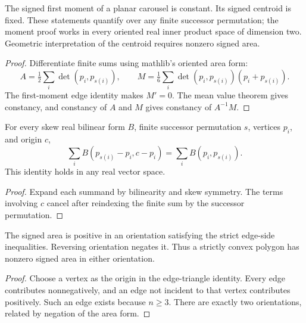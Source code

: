 \begin{proposition}
\label{prop:invariants}
\leanok
{}
The signed first moment of a planar carousel is constant.
Its signed centroid is fixed. These statements quantify over any finite
successor permutation; the moment proof works in every oriented real
inner product space of dimension two. Geometric interpretation of the
centroid requires nonzero signed area.
\end{proposition}
\begin{proof}
\leanok
Differentiate finite sums using mathlib's oriented area form:
\[
 A=\tfrac12\sum_i\det(p_i,p_{s(i)}),\qquad
 M=\tfrac16\sum_i\det(p_i,p_{s(i)})(p_i+p_{s(i)}).
\]
The first-moment edge identity makes $M'=0$. The mean value theorem gives
constancy, and constancy of $A$ and $M$ gives constancy of $A^{-1}M$.
\end{proof}

\begin{lemma}
\label{lem:edge-origin}
\leanok
For every skew real bilinear form $B$, finite successor permutation $s$,
vertices $p_i$, and origin $c$,
\[
 \sum_i B(p_{s(i)}-p_i,c-p_i)=\sum_i B(p_i,p_{s(i)}).
\]
This identity holds in any real vector space.
\end{lemma}
\begin{proof}
\leanok
Expand each summand by bilinearity and skew symmetry. The terms involving
$c$ cancel after reindexing the finite sum by the successor permutation.
\end{proof}

\begin{proposition}
\label{prop:polygon-area-nonzero}
\leanok
{}
The signed area is positive in an orientation satisfying the strict
edge-side inequalities. Reversing orientation negates it. Thus a strictly
convex polygon has nonzero signed area in either orientation.
\end{proposition}
\begin{proof}
\leanok
Choose a vertex as the origin in the edge-triangle identity. Every
edge contributes nonnegatively, and an edge not incident to that vertex
contributes positively. Such an edge exists because $n\geq3$.
There are exactly two orientations, related by negation of the area form.
\end{proof}

